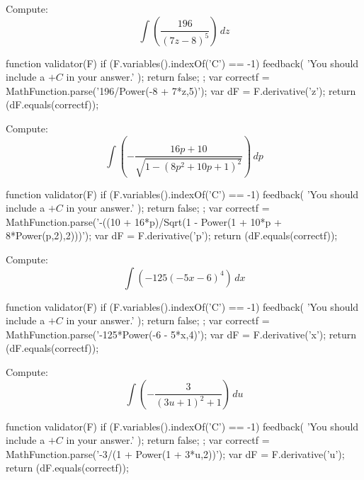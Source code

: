 \documentclass{ximera}
\renewcommand{\d}{\, d}
\begin{document}
\begin{exercise}
Compute: 
\[
\int \left(\frac{196}{(7 z-8)^5}\right)\d z
\]
\begin{expressionAnswer}
     function validator(F) {
      if (F.variables().indexOf('C') == -1) {
        feedback( 'You should include a $+C$ in your answer.' );
        return false;
      };      
      var correctf = MathFunction.parse('196/Power(-8 + 7*z,5)');
      var dF = F.derivative('z');
      return (dF.equals(correctf));
    }
\end{expressionAnswer}
\end{exercise}



\begin{exercise}
Compute: 
\[
\int \left(-\frac{16 p+10}{\sqrt{1-\left(8 p^2+10 p+1\right)^2}}\right)\d p
\]
\begin{expressionAnswer}
     function validator(F) {
      if (F.variables().indexOf('C') == -1) {
        feedback( 'You should include a $+C$ in your answer.' );
        return false;
      };      
      var correctf = MathFunction.parse('-((10 + 16*p)/Sqrt(1 - Power(1 + 10*p + 8*Power(p,2),2)))');
      var dF = F.derivative('p');
      return (dF.equals(correctf));
    }
\end{expressionAnswer}
\end{exercise}



\begin{exercise}
Compute: 
\[
\int \left(-125 (-5 x-6)^4\right)\d x
\]
\begin{expressionAnswer}
     function validator(F) {
      if (F.variables().indexOf('C') == -1) {
        feedback( 'You should include a $+C$ in your answer.' );
        return false;
      };      
      var correctf = MathFunction.parse('-125*Power(-6 - 5*x,4)');
      var dF = F.derivative('x');
      return (dF.equals(correctf));
    }
\end{expressionAnswer}
\end{exercise}



\begin{exercise}
Compute: 
\[
\int \left(-\frac{3}{(3 u+1)^2+1}\right)\d u
\]
\begin{expressionAnswer}
     function validator(F) {
      if (F.variables().indexOf('C') == -1) {
        feedback( 'You should include a $+C$ in your answer.' );
        return false;
      };      
      var correctf = MathFunction.parse('-3/(1 + Power(1 + 3*u,2))');
      var dF = F.derivative('u');
      return (dF.equals(correctf));
    }
\end{expressionAnswer}
\end{exercise}
\end{document}

